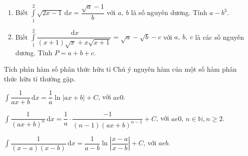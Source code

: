 \begin{bt}%
		\begin{enumerate}
		\item Biết $\displaystyle\int\limits_{1}^2 \sqrt{2x-1}\mathrm{\,d}x=\dfrac{\sqrt{a}-1}{b}$ với $a,~b$ là số nguyên dương. Tính $a-b^3$. 
		
		\item Biết $\displaystyle\int\limits_{1}^2 \dfrac{\mathrm{\,d}x}{(x+1)\sqrt{x}+x\sqrt{x+1}}=\sqrt{a}-\sqrt{b}-c$ với $a,~b,~c$ là các số nguyên dương. Tính $P=a+b+c$. 
		
\end{enumerate}
\end{bt}
\begin{dang}{Tích phân hàm số phân thức hữu tỉ}
	Chú ý nguyên hàm của một số hàm phân thức hữu tỉ thường gặp.
	\begin{enumEX}{1}
		\item $\displaystyle \int \dfrac{1}{ax+b}\mathrm{\,d}x= \dfrac{1}{a}\ln |ax+b|+C$, với $ a  e 0 $.
		\item  $\displaystyle \int \dfrac{1}{(ax+b)^n}\mathrm{\,d}x= \dfrac{1}{a}\cdot \dfrac{-1}{(n-1)(ax+b)^{n-1}}+C$, với $ a  e 0 $, $ n \in \mathbb{N}, n \geq 2 $.
		\item $\displaystyle \int \dfrac{1}{(x-a)(x-b)}\mathrm{\,d}x=\dfrac{1}{a-b}\ln {\left| \dfrac{x-a}{x-b}\right|}+C$, với $ a  e b $.
	\end{enumEX}	
\end{dang}
